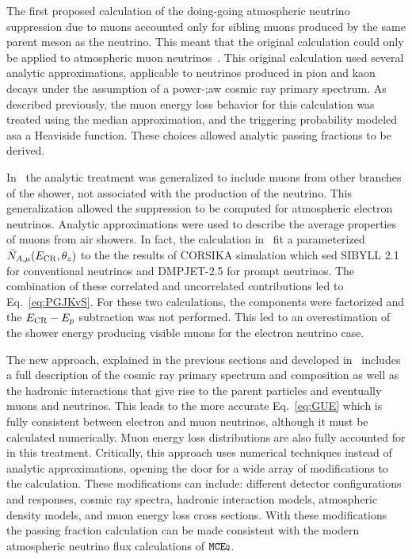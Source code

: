 The first proposed calculation of the doing-going atmospheric neutrino suppression due to muons accounted only for sibling muons produced by the same parent meson as the neutrino.
This meant that the original calculation could only be applied to atmospheric muon neutrinos~\cite{Schonert:2008is}.
This original calculation used several analytic approximations, applicable to neutrinos produced in pion and kaon decays under the assumption of a power-;aw cosmic ray primary spectrum.
As described previously, the muon energy loss behavior for this calculation was treated using the median approximation, and the triggering probability modeled asa a Heaviside function.
These choices allowed analytic passing fractions to be derived.

In~\cite{Gaisser:2014bja} the analytic treatment was generalized to include muons from other branches of the shower, not associated with the production of the neutrino.
This generalization allowed the suppression to be computed for atmospheric electron neutrinos.
Analytic approximations were used to describe the average properties of muons from air showers.
In fact, the calculation in~\cite{Gaisser:2014bja} fit a parameterized $\bar N_{A,\mu}(E_{\rm CR}, \theta_z)$ to the the results of CORSIKA simulation which sed SIBYLL 2.1 for conventional neutrinos and DMPJET-2.5 for prompt neutrinos.
The combination of these correlated and uncorrelated contributions led to Eq.~\ref{eq:PGJKvS}.
For these two calculations, the components were factorized and the $E_{\rm CR}-E_p$ subtraction was not performed.
This led to an overestimation of the shower energy producing visible muons for the electron neutrino case.

The new approach, explained in the previous sections and developed in~\cite{Arguelles:2018awr} includes a full description of the cosmic ray primary spectrum and composition as well as the hadronic interactions that give rise to the parent particles and eventually muons and neutrinos.
This leads to the more accurate Eq.~\ref{eq:GUE} which is fully consistent between electron and muon neutrinos, although it must be calculated numerically.
Muon energy loss distributions are also fully accounted for in this treatment.
Critically, this approach uses numerical techniques instead of analytic approximations, opening the door for a wide array of modifications to the calculation.
These modifications can include: different detector configurations and responses, cosmic ray spectra, hadronic interaction models, atmospheric density models, and muon energy loss cross sections.
With these modifications the passing fraction calculation can be made consistent with the modern atmospheric neutrino flux calculations of $\texttt{MCE{\scriptsize Q}}$.

